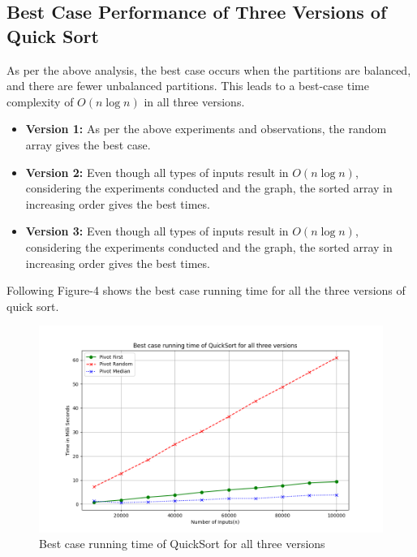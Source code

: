 \documentclass[a4paper,12pt]{report}
\begin{document}
\subsection{Best Case Performance of Three Versions of Quick Sort}
As per the above analysis, the best case occurs when the partitions are balanced, and there are fewer unbalanced partitions. This leads to a best-case time complexity of \(O(n \log n)\) in all three versions.
\begin{itemize}
    \item \textbf{Version 1:} As per the above experiments and observations, the random array gives the best case.

    \item \textbf{Version 2:} Even though all types of inputs result in \(O(n \log n)\), considering the experiments conducted and the graph, the sorted array in increasing order gives the best times.

    \item \textbf{Version 3:} Even though all types of inputs result in \(O(n \log n)\), considering the experiments conducted and the graph, the sorted array in increasing order gives the best times.
\end{itemize}
Following Figure-4 shows the best case running time for all the three versions of quick
sort.
\begin{figure}[H]
    \centering
    \includegraphics[width=1.1\textwidth]{./Best_case_QuickSort.png}
    \caption{Best case running time of QuickSort for all three versions}
    \label{fig:Best case of quicksort}
\end{figure}
\end{document}
